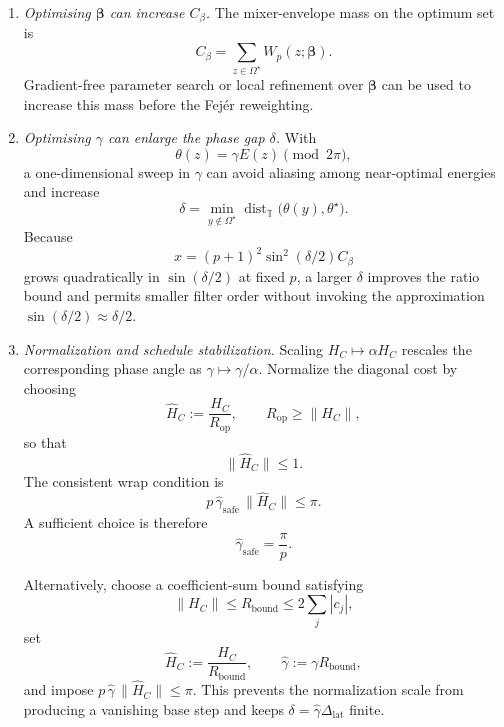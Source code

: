 \documentclass[a4paper,unpublished,onecolumn,11pt]{quantumarticle}
\theoremstyle{definition}
\theoremstyle{remark}
\begin{document}
\begin{enumerate}[leftmargin=1.6em]

\item
\emph{Optimising \(\boldsymbol\beta\) can increase \(C_\beta\).}
The mixer-envelope mass on the optimum set is
\[
C_\beta
=
\sum_{z\in\Omega^\star}
W_p(z;\boldsymbol\beta).
\]
Gradient-free parameter search or local refinement over
\(\boldsymbol\beta\) can be used to increase this mass before the
Fej\'er reweighting.

\item
\emph{Optimising \(\gamma\) can enlarge the phase gap \(\delta\).}
With
\[
\theta(z)
=
\gamma E(z)
\pmod{2\pi},
\]
a one-dimensional sweep in \(\gamma\) can avoid aliasing among
near-optimal energies and increase
\[
\delta
=
\min_{y\notin\Omega^\star}
\operatorname{dist}_{\mathbb T}
\bigl(\theta(y),\theta^\star\bigr).
\]
Because
\[
x
=
(p+1)^2
\sin^2(\delta/2)
C_\beta
\]
grows quadratically in \(\sin(\delta/2)\) at fixed \(p\), a larger
\(\delta\) improves the ratio bound and permits smaller filter order
without invoking the approximation
\(\sin(\delta/2)\approx\delta/2\).

\item
\emph{Normalization and schedule stabilization.}
Scaling \(H_C\mapsto\alpha H_C\) rescales the corresponding phase angle
as \(\gamma\mapsto\gamma/\alpha\). Normalize the diagonal cost by
choosing
\[
\widehat H_C
:=
\frac{H_C}{R_{\mathrm{op}}},
\qquad
R_{\mathrm{op}}
\ge
\|H_C\|,
\]
so that
\[
\|\widehat H_C\|
\le 1.
\]
The consistent wrap condition is
\[
p\,\widehat\gamma_{\mathrm{safe}}\,
\|\widehat H_C\|
\le
\pi.
\]
A sufficient choice is therefore
\[
\widehat\gamma_{\mathrm{safe}}
=
\frac{\pi}{p}.
\]

Alternatively, choose a coefficient-sum bound satisfying
\[
\|H_C\|
\le
R_{\mathrm{bound}}
\le
2\sum_j|c_j|,
\]
set
\[
\widehat H_C
:=
\frac{H_C}{R_{\mathrm{bound}}},
\qquad
\widehat\gamma
:=
\gamma R_{\mathrm{bound}},
\]
and impose
\(
p\,\widehat\gamma\,
\|\widehat H_C\|
\le
\pi.
\)
This prevents the normalization scale from producing a vanishing base
step and keeps
\(
\delta
=
\widehat\gamma\Delta_{\mathrm{lat}}
\) finite.

\end{enumerate}




\end{document}
